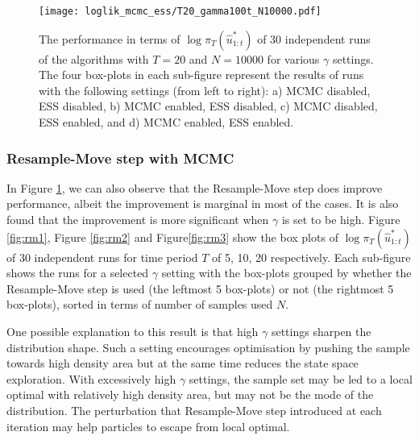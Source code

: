 \begin{figure}[!thbp]
\begin{minipage}{0.5\textwidth}
    \end{minipage}%
    \begin{minipage}{0.5\textwidth}
        \centering
        \texttt{[image: loglik\_mcmc\_ess/T20\_gamma100t\_N10000.pdf]}
    \end{minipage}
    \caption{The performance in terms of $\log\pi_T(\hat{u}^*_{1:t})$ of 30 independent runs of the algorithms  with $T=20$ and $N=10000$ for various $\gamma$ settings. The four box-plots in each sub-figure represent the results of runs with the following settings (from left to right): a) MCMC disabled, ESS disabled, b) MCMC enabled, ESS disabled, c) MCMC disabled, ESS enabled, and d) MCMC enabled, ESS enabled.   }
    \label{fig:ess}
\end{figure}

\subsubsection{Resample-Move step with MCMC}
In Figure \ref{fig:ess}, we can also observe that the Resample-Move step does improve performance, albeit the improvement is marginal  in most of the cases. It is also found that the improvement is more significant when $\gamma$ is set to be high. Figure \ref{fig:rm1}, Figure \ref{fig:rm2} and Figure\ref{fig:rm3} show the box plots of $\log\pi_T(\hat{u}^*_{1:t})$ of $30$ independent runs for time period $T$ of 5, 10, 20 respectively. Each sub-figure shows the runs for a selected $\gamma$ setting with the box-plots grouped by whether the Resample-Move step is used (the leftmost 5 box-plots) or not (the rightmost 5 box-plots), sorted in terms of number of samples used $N$.

One possible explanation to this result is that high $\gamma$ settings sharpen the distribution shape. Such a setting encourages optimisation by pushing the sample towards  high density area but at the same time reduces the state space exploration. With excessively high $\gamma$ settings, the sample set may be led to a local optimal with relatively high density area, but may not be the mode of the distribution. The perturbation that Resample-Move step introduced at each iteration may help particles to escape from local optimal.


